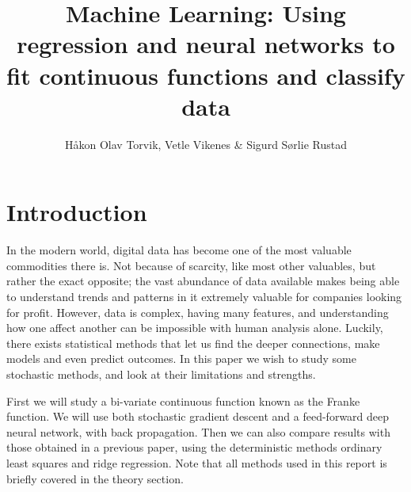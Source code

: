 \documentclass[12pt]{extarticle}
\author{\Large Håkon Olav Torvik, Vetle Vikenes \& Sigurd Sørlie Rustad}
\title{\Huge Machine Learning: Using regression and neural networks to fit continuous functions and classify data}
\affiliation{\large FYS-STK4155 – Applied Data Analysis and Machine Learning
\\Autumn 2021\\Department of Physics\\University of Oslo\\\\\today}
\begin{document}
\maketitle
\pagestyle{myplain}











\section{Introduction}
In the modern world, digital data has become one of the most valuable commodities there is. Not because of scarcity, like most other valuables, but rather the exact opposite; the vast abundance of data available makes being able to understand trends and patterns in it extremely valuable for companies looking for profit. However, data is complex, having many features, and understanding how one affect another can be impossible with human analysis alone. Luckily, there exists statistical methods that let us find the deeper connections, make models and even predict outcomes. In this paper we wish to study some stochastic methods, and look at their limitations and strengths.

First we will study a bi-variate continuous function known as the Franke function. We will use both stochastic gradient descent and a feed-forward deep neural network, with back propagation. Then we can also compare results with those obtained in a previous paper, using the deterministic methods ordinary least squares and ridge regression. Note that all methods used in this report is briefly covered in the theory section.
\end{document}
